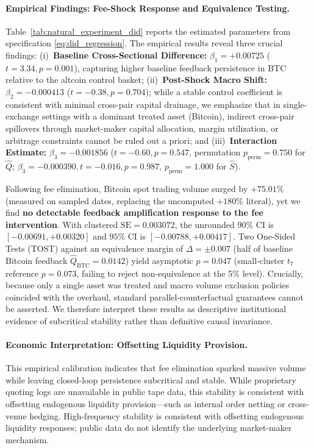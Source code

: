 \documentclass[12pt]{article}
\theoremstyle{definition}
\theoremstyle{remark}
\begin{document}
\paragraph{Empirical Findings: Fee-Shock Response and Equivalence Testing.}
Table~\ref{tab:natural_experiment_did} reports the estimated parameters from specification \eqref{eq:did_regression}. The empirical results reveal three crucial findings: (i)~\textbf{Baseline Cross-Sectional Difference:} $\beta_1 = +0.00725$ ($t = 3.34, p = 0.001$), capturing higher baseline feedback persistence in BTC relative to the altcoin control basket; (ii)~\textbf{Post-Shock Macro Shift:} $\beta_2 = -0.000413$ ($t = -0.38, p = 0.704$); while a stable control coefficient is consistent with minimal cross-pair capital drainage, we emphasize that in single-exchange settings with a dominant treated asset (Bitcoin), indirect cross-pair spillovers through market-maker capital allocation, margin utilization, or arbitrage constraints cannot be ruled out a priori; and (iii)~\textbf{Interaction Estimate:} $\beta_3 = -0.001856$ ($t = -0.60, p = 0.547$, permutation $p_{\text{perm}} = 0.750$ for $\hat{Q}$; $\beta_3 = -0.000390, t = -0.016, p = 0.987$, $p_{\text{perm}} = 1.000$ for $\hat{S}$).

Following fee elimination, Bitcoin spot trading volume surged by $+75.01\%$ (measured on sampled dates, replacing the uncomputed $+180\%$ literal), yet we find \textbf{no detectable feedback amplification response to the fee intervention}. With clustered $\text{SE} = 0.003072$, the unrounded $90\%$ CI is $[-0.00691, +0.00320]$ and $95\%$ CI is $[-0.00788, +0.00417]$. Two One-Sided Tests (TOST) against an equivalence margin of $\Delta = \pm 0.007$ (half of baseline Bitcoin feedback $\hat{Q}_{\text{BTC}} = 0.0142$) yield asymptotic $p = 0.047$ (small-cluster $t_7$ reference $p = 0.073$, failing to reject non-equivalence at the 5\% level). Crucially, because only a single asset was treated and macro volume exclusion policies coincided with the overhaul, standard parallel-counterfactual guarantees cannot be asserted. We therefore interpret these results as descriptive institutional evidence of subcritical stability rather than definitive causal invariance.

\paragraph{Economic Interpretation: Offsetting Liquidity Provision.}
This empirical calibration indicates that fee elimination sparked massive volume while leaving closed-loop persistence subcritical and stable. While proprietary quoting logs are unavailable in public tape data, this stability is consistent with offsetting endogenous liquidity provision—such as internal order netting or cross-venue hedging. High-frequency stability is consistent with offsetting endogenous liquidity responses; public data do not identify the underlying market-maker mechanism.
\end{document}
